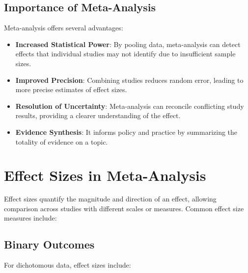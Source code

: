 \documentclass[12pt,a4paper]{report}
\begin{document}
\subsection{Importance of Meta-Analysis}
\label{subsec:importance_meta_analysis}

Meta-analysis offers several advantages:

\begin{itemize}
    \item \textbf{Increased Statistical Power}: By pooling data, meta-analysis can detect effects that individual studies may not identify due to insufficient sample sizes.
    \item \textbf{Improved Precision}: Combining studies reduces random error, leading to more precise estimates of effect sizes.
    \item \textbf{Resolution of Uncertainty}: Meta-analysis can reconcile conflicting study results, providing a clearer understanding of the effect.
    \item \textbf{Evidence Synthesis}: It informs policy and practice by summarizing the totality of evidence on a topic.
\end{itemize}

\section{Effect Sizes in Meta-Analysis}
\label{sec:effect_sizes}

Effect sizes quantify the magnitude and direction of an effect, allowing comparison across studies with different scales or measures. Common effect size measures include:

\subsection{Binary Outcomes}
\label{subsec:binary_outcomes}

For dichotomous data, effect sizes include:
\end{document}
